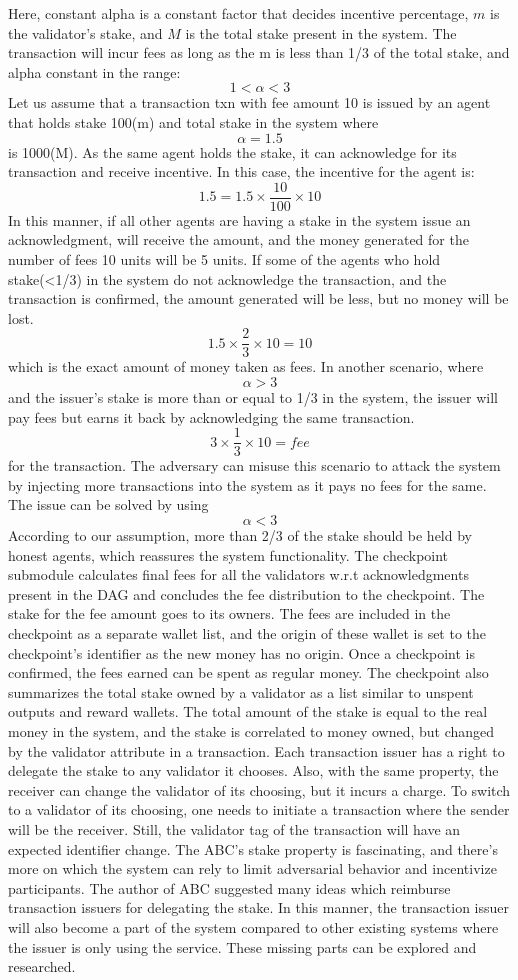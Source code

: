 {Here, constant alpha is a constant factor that decides incentive percentage, $m$ is the validator's stake, and $M$ is the total stake present in the system. The transaction will incur fees as long as the m is less than 1/3 of the total stake, and alpha constant in the range: $$1<\alpha<3$$
Let us assume that a transaction txn with fee amount 10 is issued by an agent that holds stake 100(m) and total stake in the system where $$\alpha=1.5$$ is 1000(M). As the same agent holds the stake, it can acknowledge for its transaction and receive incentive. In this case, the incentive for the agent is:
$$1.5 = 1.5 \times \dfrac{10}{100} \times 10$$ In this manner, if all other agents are having a stake in the system issue an acknowledgment, will receive the amount, and the money generated for the number of fees 10 units will be 5 units. If some of the agents who hold stake(<1/3) in the system do not acknowledge the transaction, and the transaction is confirmed, the amount generated will be less, but no money will be lost.
$$1.5 \times \dfrac{2}{3} \times 10 = 10$$ which is the exact amount of money taken as fees.
In another scenario, where $$\alpha>3$$ and the issuer's stake is more than or equal to 1/3 in the system, the issuer will pay fees but earns it back by acknowledging the same transaction.
$$3 \times \dfrac{1}{3} \times 10 = fee$$ for the transaction. The adversary can misuse this scenario to attack the system by injecting more transactions into the system as it pays no fees for the same. The issue can be solved by using $$\alpha<3$$ According to our assumption, more than 2/3 of the stake should be held by honest agents, which reassures the system functionality. The checkpoint submodule calculates final fees for all the validators w.r.t acknowledgments present in the DAG and concludes the fee distribution to the checkpoint. The stake for the fee amount goes to its owners. The fees are included in the checkpoint as a separate wallet list, and the origin of these wallet is set to the checkpoint's identifier as the new money has no origin. Once a checkpoint is confirmed, the fees earned can be spent as regular money. The checkpoint also summarizes the total stake owned by a validator as a list similar to unspent outputs and reward wallets. The total amount of the stake is equal to the real money in the system, and the stake is correlated to money owned, but changed by the validator attribute in a transaction. Each transaction issuer has a right to delegate the stake to any validator it chooses. Also, with the same property, the receiver can change the validator of its choosing, but it incurs a charge. To switch to a validator of its choosing, one needs to initiate a transaction where the sender will be the receiver. Still, the validator tag of the transaction will have an expected identifier change. The ABC's stake property is fascinating, and there's more on which the system can rely to limit adversarial behavior and incentivize participants. The author of ABC \cite{abc_paper}  suggested many ideas which reimburse transaction issuers for delegating the stake. In this manner, the transaction issuer will also become a part of the system compared to other existing systems where the issuer is only using the service. These missing parts can be explored and researched. 
}
